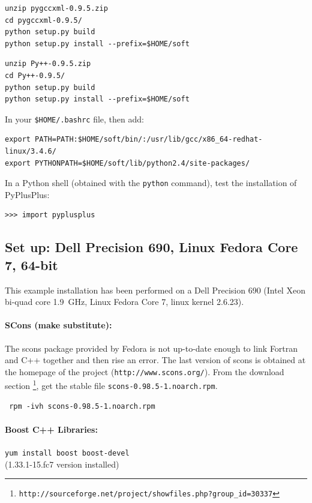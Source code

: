 \documentclass[12pt,a4paper]{article}
\begin{document}
\begin{verbatim}
unzip pygccxml-0.9.5.zip
cd pygccxml-0.9.5/
python setup.py build
python setup.py install --prefix=$HOME/soft
\end{verbatim}

\begin{verbatim}
unzip Py++-0.9.5.zip 
cd Py++-0.9.5/
python setup.py build
python setup.py install --prefix=$HOME/soft
\end{verbatim}

In your {\tt \$HOME/.bashrc} file, then add:
\begin{verbatim}
export PATH=PATH:$HOME/soft/bin/:/usr/lib/gcc/x86_64-redhat-linux/3.4.6/
export PYTHONPATH=$HOME/soft/lib/python2.4/site-packages/
\end{verbatim}

In a Python shell (obtained with the {\tt python} command), test the installation
of PyPlusPlus:
\begin{verbatim}
>>> import pyplusplus
\end{verbatim}

\subsection{Set up: Dell Precision 690, Linux Fedora Core 7, 64-bit}
This example installation has been performed on a Dell Precision 690 (Intel
Xeon bi-quad core 1.9~GHz, Linux Fedora Core 7, linux kernel 2.6.23).

\paragraph{SCons (make substitute):}
The scons package provided by Fedora is not up-to-date enough to link Fortran and C++ together and then rise an
error. The last version of scons is obtained at the homepage of the project ({\tt  http://www.scons.org/}).
From the download section \footnote{\tt http://sourceforge.net/project/showfiles.php?group\_id=30337}, 
get the stable file {\tt scons-0.98.5-1.noarch.rpm}.

\begin{verbatim}
 rpm -ivh scons-0.98.5-1.noarch.rpm
\end{verbatim}

\paragraph{Boost C++ Libraries:} {\tt yum install boost boost-devel} \\
(1.33.1-15.fc7 version installed)
\end{document}
